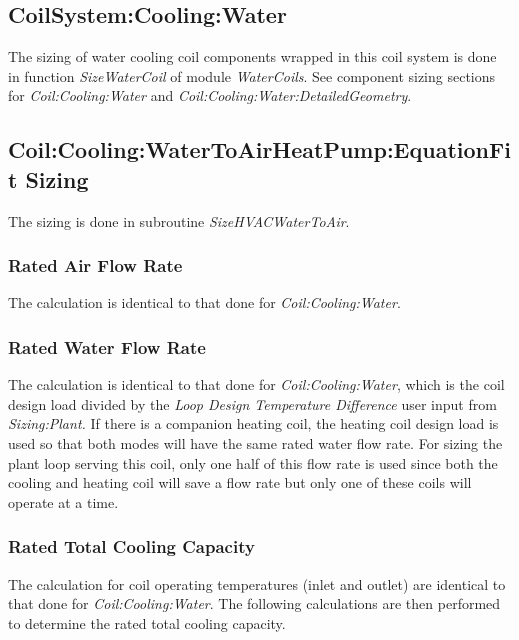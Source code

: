 \subsection{CoilSystem:Cooling:Water}\label{coilsystemcoolingwater}

The sizing of water cooling coil components wrapped in this coil system is done in function \textit{SizeWaterCoil} of module \textit{WaterCoils}. See component sizing sections for \textit{Coil:Cooling:Water} and \textit{Coil:Cooling:Water:DetailedGeometry}.


\subsection{Coil:Cooling:WaterToAirHeatPump:EquationFit Sizing}\label{coilcoolingwatertoairheatpumpequationfit-sizing}

The sizing is done in subroutine \emph{SizeHVACWaterToAir}.

\subsubsection{Rated Air Flow Rate}\label{rated-air-flow-rate}

The calculation is identical to that done for \emph{Coil:Cooling:Water}.

\subsubsection{Rated Water Flow Rate}\label{rated-water-flow-rate}

The calculation is identical to that done for \emph{Coil:Cooling:Water}, which is the coil design load divided by the \emph{Loop Design Temperature Difference} user input from \emph{Sizing:Plant.} If there is a companion heating coil, the heating coil design load is used so that both modes will have the same rated water flow rate. For sizing the plant loop serving this coil, only one half of this flow rate is used since both the cooling and heating coil will save a flow rate but only one of these coils will operate at a time.

\subsubsection{Rated Total Cooling Capacity}\label{rated-total-cooling-capacity}

The calculation for coil operating temperatures (inlet and outlet) are identical to that done for \emph{Coil:Cooling:Water}. The following calculations are then performed to determine the rated total cooling capacity.

